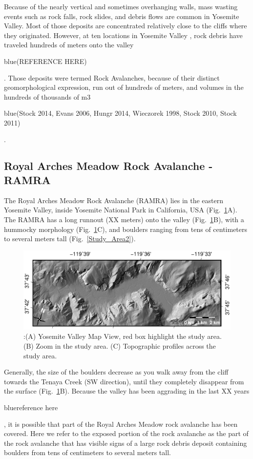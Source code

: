\documentclass[5p]{elsarticle}
\newcommand{\COMON}{\begin{color}{blue}}
\newcommand{\COMOFF}{\end{color}}
\begin{document}
Because of  the nearly vertical and sometimes overhanging walls, mass wasting events such as rock falls, rock slides, and debris flows are common in Yosemite Valley. Most of those deposits are concentrated relatively close to the cliffs where they originated. However, at ten locations in Yosemite Valley , rock debris have traveled hundreds of meters onto the valley \COMON(REFERENCE HERE)\COMOFF. Those deposits were termed Rock Avalanches, because of their distinct geomorphological expression, run out of hundreds of meters, and volumes in the hundreds of thousands of m3 \COMON(Stock 2014, Evans 2006,  Hungr 2014, Wieczorek 1998, Stock 2010, Stock 2011)\COMOFF. 
\bigskip


   
\subsection{Royal Arches Meadow Rock Avalanche - RAMRA}

The Royal Arches Meadow Rock Avalanche (RAMRA) lies in the eastern Yosemite Valley, inside Yosemite National Park in California, USA (Fig.~\ref{Study_Area}A). The RAMRA has a long runnout (XX meters) onto the valley (Fig.~\ref{Study_Area}B), with a hummocky morphology (Fig.~\ref{Study_Area}C), and boulders ranging from tens of centimeters to several meters tall (Fig.~\ref{Study_Area2}).


								   \begin{figure}[h]

	\includegraphics[width=\textwidth]{Yosemite.pdf}
		\caption{:(A) Yosemite Valley Map View, red box highlight the study area. (B) Zoom in the study area. (C) Topographic profiles across the study area.  \label{Study_Area}}

								   \end{figure}




Generally, the size of the boulders decrease as you walk away from the cliff towards the Tenaya Creek (SW direction), until they completely disappear from the surface (Fig.~\ref{Study_Area}B). Because the valley has been aggrading in the last XX years \COMON reference here \COMOFF, it is possible that part of the Royal Arches Meadow rock avalanche has been covered. Here we refer to the exposed portion of the rock avalanche as the part of the rock avalanche that has visible signs of a large rock debris deposit containing boulders from tens of centimeters to several meters tall.   
\end{document}
